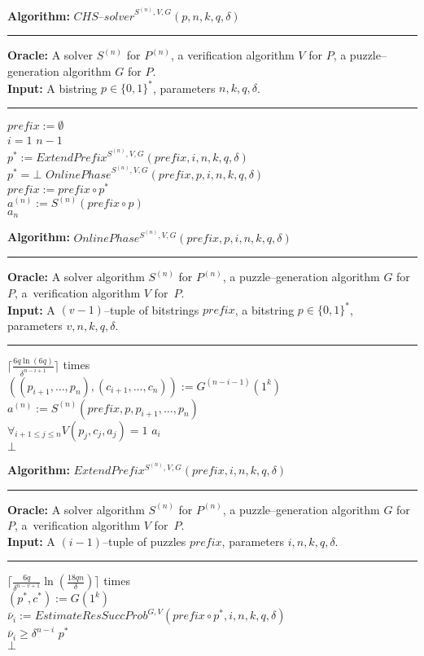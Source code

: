 \begin{codeblock}
  \textbf{Algorithm:} $\mathit{CHS\text{--}solver}^{S^{(n)},V,G}(p, n, k, q, \delta)$
  \medskip\hrule
  \textbf{Oracle:} A solver $S^{(n)}$ for $P^{(n)}$, a verification algorithm $V$ for $P$, a puzzle--generation algorithm $G$ for $P$.\\
  \textbf{Input:}  A bistring $p \in \{0,1\}^{*}$, parameters $n, k, q, \delta$.
  \medskip\hrule
  $\mathit{prefix} := \emptyset$\\
  \For $i = 1$ \To $n\!-\!1$ \Do \\
  \IndI $p^* := \mathit{ExtendPrefix}^{S^{(n)}, V, G}(\mathit{prefix}, i, n, k, q, \delta)$\\
  \IndI \If $p^* = \bot$ \Then \Return $\mathit{OnlinePhase}^{S^{(n)}, V, G}(\mathit{prefix}, p, i, n, k, q, \delta)$ \\
  \IndI \Else $\mathit{prefix} := \mathit{prefix} \circ p^*$\\
  $ a^{(n)} := S^{(n)}(\mathit{prefix} \circ p)$ \\
  \Return $a_n$
\end{codeblock}
%
\begin{codeblock}
  \textbf{Algorithm:} $\mathit{OnlinePhase^{S^{(n)}, V, G}(\mathit{prefix}, p, i, n, k, q, \delta)}$
  \medskip \hrule
  \textbf{Oracle:} A solver algorithm $S^{(n)}$ for $P^{(n)}$, a puzzle--generation algorithm $G$ for $P$, a~verification algorithm $V$ for~$P$.\\
  \textbf{Input:} A $(v-1)$--tuple of bitstrings $\mathit{prefix}$, a bitstring $p \in \{0,1\}^{*}$, \\ parameters $v, n, k, q, \delta$.
  \medskip\hrule
  \Repeat $\Big\lceil\frac{6q \ln (6q)}{\delta^{n-i+1}}\Big\rceil$ times \\
  \IndI $((p_{i+1}, \dotsc, p_{n}),(c_{i+1}, \dots, c_n)) := G^{(n-i-1)}(1^k)$\\
  \IndI $a^{(n)} := S^{(n)}(\mathit{prefix}, p, p_{i+1}, \dotsc, p_n)$\\
  \IndI \If $\forall_{i+1 \leq j \leq n} V(p_j, c_j, a_j) = 1$ \Then \Return $a_i$\\
  \Return $\bot$
\end{codeblock}
%
\begin{codeblock}
  \textbf{Algorithm:} $\mathit{ExtendPrefix^{S^{(n)}, V, G}(prefix, i, n, k, q, \delta)}$
  \medskip \hrule
  \textbf{Oracle:} A solver algorithm $S^{(n)}$ for $P^{(n)}$, a puzzle--generation algorithm $G$ for $P$, a~verification algorithm $V$ for~$P$.\\
  \textbf{Input:} A $(i-1)$--tuple of puzzles $\mathit{prefix}$, parameters $i, n, k, q, \delta$.
  \medskip\hrule
  \Repeat $\Big\lceil \frac{6q}{\delta^{n-v+1}} \ln (\frac{18qn}{\delta}) \Big\rceil$ times \\
  \IndI $(p^*, c^*) := G(1^k) $\\
  \IndI $\bar{\nu}_i := \mathit{EstimateResSuccProb}^{G,V}(\mathit{prefix} \circ p^*, i, n, k, q, \delta)$\\
  \IndI \If $\bar{\nu}_i \geq \delta^{n-i}$ \Then \Return $p^*$ \\
  \Return $\bot$
\end{codeblock}
